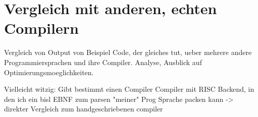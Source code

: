 \chapter{Vergleich mit anderen, echten Compilern}
\label{chap:conclusion:thunderdome}

Vergleich von Output von Beispiel Code, der gleiches tut, ueber mehrere andere Programmiersprachen und ihre Compiler.
Analyse, Ausblick auf Optimierungsmoeglichkeiten.

Vielleicht witzig: Gibt bestimmt einen Compiler Compiler mit RISC Backend, in den ich ein bisl EBNF zum parsen "meiner" Prog Sprache packen kann -> direkter Vergleich zum handgeschriebenen compiler
